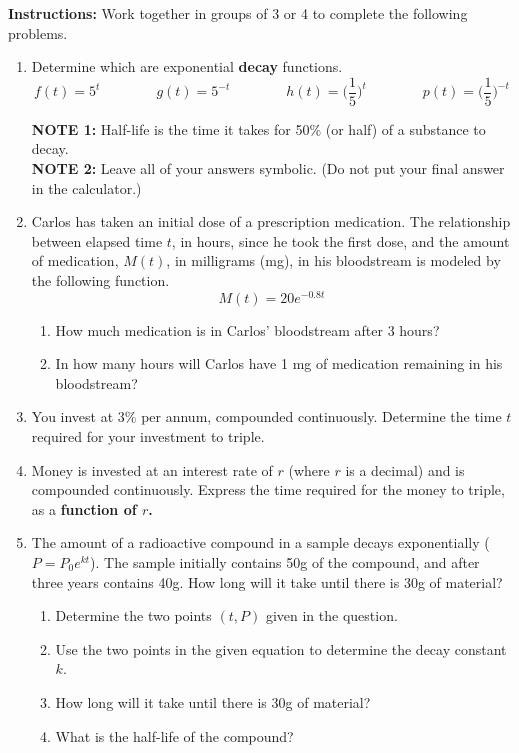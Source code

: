 



\noindent \textbf{Instructions:}  Work together in groups of  3 or 4 to complete the following problems.\\

\begin{enumerate}


\item Determine which are exponential \textbf{decay} functions.
$$f(t)=5^t \quad \quad \quad \quad g(t)=5^{-t}  \quad \quad \quad \quad h(t)=\Big(\frac{1}{5}\Big)^{t}  \quad \quad \quad \quad p(t)=\Big(\frac{1}{5}\Big)^{-t}$$


\noindent \textbf{NOTE 1:  }Half-life is the time it takes for 50\% (or half) of a substance to decay.\\
\noindent \textbf{NOTE 2:  }Leave all of your answers symbolic.  (Do not put your final answer in the calculator.)\\


\item Carlos has taken an initial dose of a prescription medication.  The relationship between elapsed time $t$, in hours, since he took the first dose, and the amount of medication, $M(t)$, in milligrams (mg), in his bloodstream is modeled by the following function. $$M(t)=20e^{-0.8t}$$

\begin{enumerate}
\item  How much medication is in Carlos' bloodstream after 3 hours?\vfill
\item In how many hours will Carlos have 1 mg of medication remaining in his bloodstream?\vfill
\vfill
\end{enumerate}

\item You invest at 3\% per annum, compounded continuously.  Determine the time $t$ required for your investment to triple.\vfill


\newpage

\item Money is invested at an interest rate of $r$ (where $r$ is a decimal) and is compounded continuously.  Express the time required for the money to triple, as a \textbf{function of $r$.}\vfill

\item The amount of a radioactive compound in a sample decays exponentially ($P=P_0e^{kt}$).  The sample initially contains 50g of the compound, and after three years contains 40g.  How long will it take until there is 30g of material?
\begin{enumerate}
\item Determine the two points $(t,P)$ given in the question.\\[.5in]
\item Use the two points in the given equation to determine the decay constant $k$.
\vfill
\item How long will it take until there is 30g of material?
\vfill
\item What is the half-life of the compound?\vfill
\end{enumerate}


\end{enumerate}
